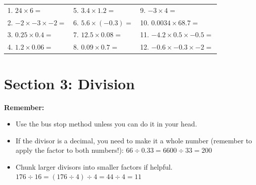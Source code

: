 \documentclass[12pt,a4paper]{article}
\begin{document}
\begin{center}
\begin{tabular}{p{} p{} p{}}
1. $24 \times 6 =$ \vspace{2em} & 
5. $3.4 \times 1.2 =$ \vspace{2em} & 
9. $-3 \times 4 =$ \vspace{2em} \\

2. $-2 \times -3 \times -2 =$ \vspace{2em} & 
6. $5.6 \times (-0.3) =$ \vspace{2em} & 
10. $0.0034 \times 68.7 =$ \vspace{2em} \\

3. $0.25 \times 0.4 =$ \vspace{2em} & 
7. $12.5 \times 0.08 =$ \vspace{2em} & 
11. $-4.2 \times 0.5 \times -0.5 =$  \vspace{2em} \\

4. $1.2 \times 0.06 =$ \vspace{2em} & 
8. $0.09 \times 0.7 =$ \vspace{2em} & 
12. $-0.6 \times -0.3 \times -2 =$ \vspace{2em} \\
\end{tabular}
\end{center}



\newpage

\section*{Section 3: Division}

\textbf{Remember:}
\begin{itemize}
    \item Use the bus stop method unless you can do it in your head.
    \item If the divisor is a decimal, you need to make it a whole  number (remember to apply the factor to both numbers!): \newline $ 66 \div 0.33 = 6600 \div 33 = 200 $
    \item Chunk larger divisors into smaller factors if helpful. \newline $176 \div 16 = ( 176 \div 4) \div 4 = 44 \div 4 = 11$
\end{itemize}
\end{document}
